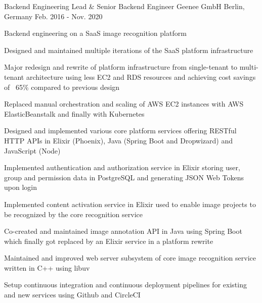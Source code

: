 

\begin{cventries}

  \cventry
    {Backend Engineering Lead \& Senior Backend Engineer} %
    {Geenee GmbH} %
    {Berlin, Germany} %
    {Feb. 2016 - Nov. 2020} %
    {
      \begin{cvitems} %
        \item {Backend engineering on a SaaS image recognition platform}
        \item {Designed and maintained multiple iterations of the SaaS platform infrastructure}
        \begin{cvsubitems}
          \item {Major redesign and rewrite of platform infrastructure from single-tenant to multi-tenant architecture using less EC2 and RDS resources and achieving cost savings of ~65\% compared to previous design}
          \item {Replaced manual orchestration and scaling of AWS EC2 instances with AWS ElasticBeanstalk and finally with Kubernetes}
        \end{cvsubitems}
        \item {Designed and implemented various core platform services offering RESTful HTTP APIs in Elixir (Phoenix), Java (Spring Boot and Dropwizard) and JavaScript (Node)}
        \begin{cvsubitems}
          \item {Implemented authentication and authorization service in Elixir storing user, group and permission data in PostgreSQL and generating JSON Web Tokens upon login}
          \item {Implemented content activation service in Elixir used to enable image projects to be recognized by the core recognition service}
          \item {Co-created and maintained image annotation API in Java using Spring Boot which finally got replaced by an Elixir service in a platform rewrite}
        \end{cvsubitems}
        \item {Maintained and improved web server subsystem of core image recognition service written in C++ using libuv}
        \item {Setup continuous integration and continuous deployment pipelines for existing and new services using Github and CircleCI}
      \end{cvitems}
    }


\end{cventries}
